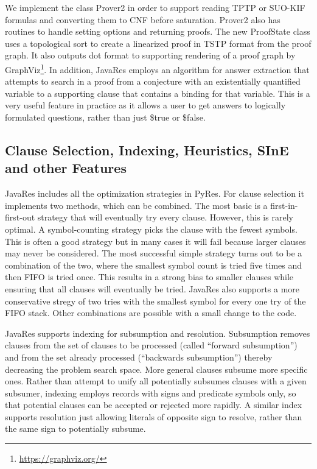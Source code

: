 \documentclass{llncs}
\begin{document}
We implement the class Prover2 in order to support reading TPTP or
SUO-KIF formulas and converting them to CNF before saturation.
Prover2 also has routines to handle setting options and returning
proofs.  The new ProofState class uses a topological sort
\cite{DBLP:journals/cacm/Kahn62} to create a linearized proof in TSTP
format from the proof graph.  It also outputs dot format to supporting
rendering of a proof graph by GraphViz\footnote{\url{https://graphviz.org/}}.
In addition, JavaRes employs an
algorithm for answer extraction that attempts to search in a proof from
a conjecture with an existentially quantified variable to a supporting
clause that contains a binding for that variable.  This is a very useful
feature in practice as it allows a user to get answers to logically
formulated questions, rather than just \$true or \$false.

\subsection{Clause Selection, Indexing, Heuristics, SInE and other Features}

JavaRes includes all the optimization strategies in PyRes.  For clause
selection it implements two methods, which can be combined.  The most
basic is a first-in-first-out strategy that will eventually try every
clause.  However, this is rarely optimal.  A symbol-counting strategy
picks the clause with the fewest symbols.  This is often a good
strategy but in many cases it will fail because larger clauses may
never be considered.  The most successful simple strategy turns out to
be a combination of the two, where the smallest symbol count is tried
five times and then FIFO is tried once.  This results in a strong bias
to smaller clauses while ensuring that all clauses will eventually be
tried.  JavaRes also supports a more conservative stregy of two tries
with the smallest symbol for every one try of the FIFO stack.  Other
combinations are possible with a small change to the code.

JavaRes supports indexing for subsumption and resolution.  Subsumption
removes clauses from the set of clauses to be processed (called
``forward subsumption'') and from the set already processed (``backwards
subsumption'') thereby decreasing the problem search space.  More
general clauses subsume more specific ones.  Rather than attempt to
unify all potentially subsumes clauses with a given subsumer, indexing employs
records with signs and predicate symbols only, so that potential clauses can
be accepted or rejected more rapidly.  A similar index supports
resolution just allowing literals of opposite sign to resolve,
rather than the same sign to potentially subsume.
\end{document}
